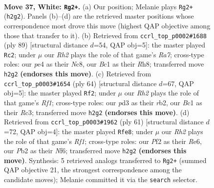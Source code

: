 \documentclass[11pt]{article}
\begin{document}
\clearpage

\begin{figure}[p]\centering
\begin{subfigure}{0.46\textwidth}\centering
\resizebox{\linewidth}{!}{%
\newchessgame
\chessboard[
  setfen={7r/5pkr/5n2/8/p3p2p/3p3P/PP3P1R/1RB1K3 w - - 14 37},
  showmover=false,
  pgfstyle=straightmove, color=movearrow, markmove={h2-g2}
]}
\caption{}
\end{subfigure}\hfill
\begin{subfigure}{0.46\textwidth}\centering
\resizebox{\linewidth}{!}{%
\newchessgame
\chessboard[
  setfen={2n4r/p1p2k2/2p2p2/7P/2P1RP2/4RKN1/r7/8 b - - 2 45},
  showmover=false,
  pgfstyle=straightmove, color=movearrow, markmove={a2-c2}
]}
\caption{}
\end{subfigure}
\\[4pt]
\begin{subfigure}{0.46\textwidth}\centering
\resizebox{\linewidth}{!}{%
\newchessgame
\chessboard[
  setfen={5rk1/1N3ppn/4p2p/1p6/4PPP1/2RP3P/1r4K1/5R2 w - - 4 33},
  showmover=false,
  pgfstyle=straightmove, color=movearrow, markmove={f1-f2}
]}
\caption{}
\end{subfigure}\hfill
\begin{subfigure}{0.46\textwidth}\centering
\resizebox{\linewidth}{!}{%
\newchessgame
\chessboard[
  setfen={2k2r2/2p5/p3rnp1/1p5p/4pP1P/4N1P1/PPPR4/2KR4 b - - 0 31},
  showmover=false,
  pgfstyle=straightmove, color=movearrow, markmove={f8-e8}
]}
\caption{}
\end{subfigure}
\caption{\textbf{Move 37, White: \texttt{Rg2+}.} (a) Our position; Melanie plays \texttt{Rg2+} (\texttt{h2g2}). Panels (b)--(d) are the retrieved master positions whose correspondence most drove this move (highest QAP objective among those that transfer to it). (b) Retrieved from \texttt{ccrl\_top\_p0002\#1688} (ply 89) [structural distance $d$=54, QAP obj=5]: the master played \texttt{Rc2}; under $\mu$ our \emph{Rh2} plays the role of that game's \emph{Ra7}; cross-type roles: our \emph{p}e4 as their \emph{N}c8, our \emph{B}c1 as their \emph{R}h8; transferred move \texttt{h2g2} \textbf{(endorses this move)}. (c) Retrieved from \texttt{ccrl\_top\_p0003\#1654} (ply 64) [structural distance $d$=67, QAP obj=5]: the master played \texttt{Rf2}; under $\mu$ our \emph{Rh2} plays the role of that game's \emph{Rf1}; cross-type roles: our \emph{p}d3 as their \emph{r}b2, our \emph{B}c1 as their \emph{R}c3; transferred move \texttt{h2g2} \textbf{(endorses this move)}. (d) Retrieved from \texttt{ccrl\_top\_p0003\#1962} (ply 61) [structural distance $d$=72, QAP obj=4]: the master played \texttt{Rfe8}; under $\mu$ our \emph{Rh2} plays the role of that game's \emph{Rf1}; cross-type roles: our \emph{P}f2 as their \emph{R}e6, our \emph{P}b2 as their \emph{N}f6; transferred move \texttt{h2g2} \textbf{(endorses this move)}. Synthesis: 5 retrieved analogs transferred to \texttt{Rg2+} (summed QAP objective 21, the strongest correspondence among the candidate moves); Melanie committed it via the \texttt{search} selector.}
\label{fig:thought-m72}
\end{figure}
\end{document}
